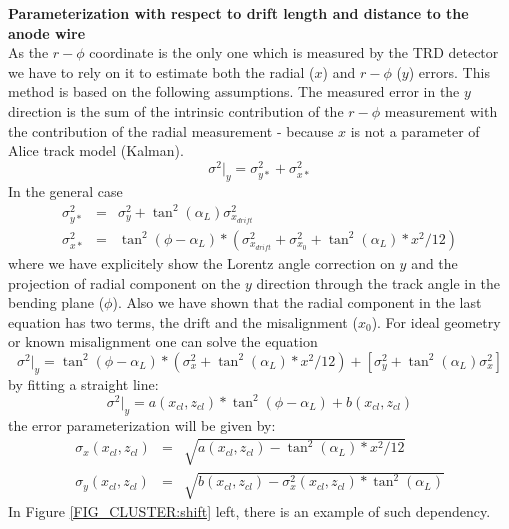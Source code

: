 \documentclass{alicetdr}
\begin{document}
\noindent
{\bf Parameterization with respect to drift length and distance to the anode wire}
\\

As the $r-\phi$ coordinate is the only one which is measured by the TRD detector we
have to rely on it to estimate both the radial ($x$) and $r-\phi$ ($y$) errors. This
method is based on the following assumptions. The measured error in the $y$
direction is the sum of the intrinsic contribution of the $r-\phi$ measurement
with the contribution of the radial measurement - because $x$ is not a parameter of
Alice track model (Kalman).
\begin{equation}
\sigma^{2}|_{y} = \sigma^{2}_{y*} + \sigma^{2}_{x*}
\end{equation}
In the general case
\begin{eqnarray}
\sigma^{2}_{y*}& =& \sigma^{2}_{y} + \tan^{2}(\alpha_{L})\sigma^{2}_{x_{drift}}\\
\sigma^{2}_{x*} &=& \tan^{2}(\phi - \alpha_{L})*(\sigma^{2}_{x_{drift}}
                 + \sigma^{2}_{x_{0}} + \tan^{2}(\alpha_{L})*x^{2}/12)
\end{eqnarray}
where we have explicitely show the Lorentz angle correction on $y$ and the projection
of radial component on the $y$ direction through the track angle in the bending plane
($\phi$). Also we have shown that the radial component in the last equation has two
terms, the drift and the misalignment ($x_0$). For ideal geometry or known misalignment
one can solve the equation
\begin{equation}
\sigma^{2}|_{y} = \tan^{2}(\phi - \alpha_{L})*(\sigma^{2}_{x}
                + \tan^{2}(\alpha_{L})*x^{2}/12)
                + [\sigma^{2}_{y} + \tan^{2}(\alpha_{L})\sigma^{2}_{x}]
\end{equation}
by fitting a straight line:
\begin{equation}
\sigma^{2}|_{y} = a(x_{cl}, z_{cl}) * \tan^{2}(\phi - \alpha_{L}) + b(x_{cl}, z_{cl})
\end{equation}
the error parameterization will be given by:
\begin{eqnarray}
\sigma_{x} (x_{cl}, z_{cl}) &=& \sqrt{a(x_{cl}, z_{cl}) - \tan^{2}(\alpha_{L})*x^{2}/12}\\
\sigma_{y} (x_{cl}, z_{cl}) &=& \sqrt{b(x_{cl}, z_{cl}) - \sigma^{2}_{x} (x_{cl}, z_{cl})
                             * \tan^{2}(\alpha_{L})}
\end{eqnarray}
In Figure \ref{FIG_CLUSTER:shift} left, there is an example of such dependency.
\end{document}
